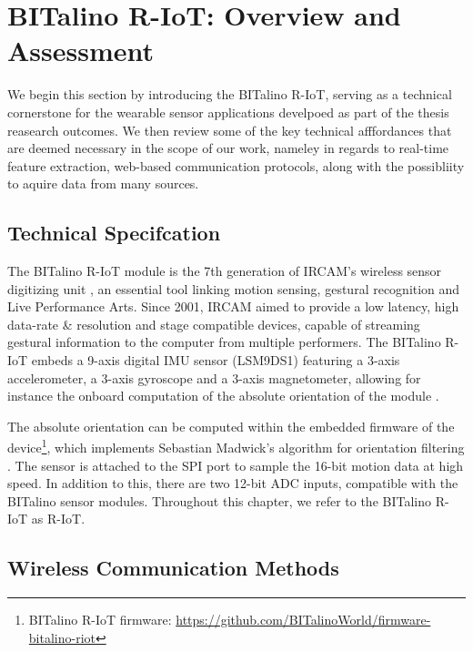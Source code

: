 \section{BITalino R-IoT: Overview and Assessment}

We begin this section by introducing the BITalino R-IoT, serving as a technical cornerstone for the wearable sensor applications develpoed as part of the thesis reasearch outcomes. We then review some of the key technical afffordances that are deemed necessary in the scope of our work, nameley in regards to real-time feature extraction, web-based communication protocols, along with the possibliity to aquire data from many sources.

\subsection*{Technical Specifcation}
\label{subsec:riot}


The BITalino R-IoT module is the 7th generation of IRCAM's wireless sensor digitizing unit \cite{noauthor_bitalino_nodate}, an essential tool linking motion sensing, gestural recognition and Live Performance Arts. Since 2001, IRCAM aimed to provide a low latency, high data-rate \& resolution and stage compatible devices, capable of streaming gestural information to the computer from multiple performers. The BITalino R-IoT embeds a 9-axis digital IMU sensor (LSM9DS1) featuring a 3-axis accelerometer, a 3-axis gyroscope and a 3-axis magnetometer, allowing for instance the onboard computation of the absolute orientation of the module \cite{matzka_developing_2019}.

The absolute orientation can be computed within the embedded firmware of the device\footnote{BITalino R-IoT firmware: \url{https://github.com/BITalinoWorld/firmware-bitalino-riot}}, which implements Sebastian Madwick’s algorithm for orientation filtering \cite{madgwick_ecient_nodate}. The sensor is attached to the SPI port to sample the 16-bit motion data at high speed. In addition to this, there are two 12-bit ADC inputs, compatible with the BITalino sensor modules. Throughout this chapter, we refer to the BITalino R-IoT as R-IoT.

\subsection*{Wireless Communication Methods}

